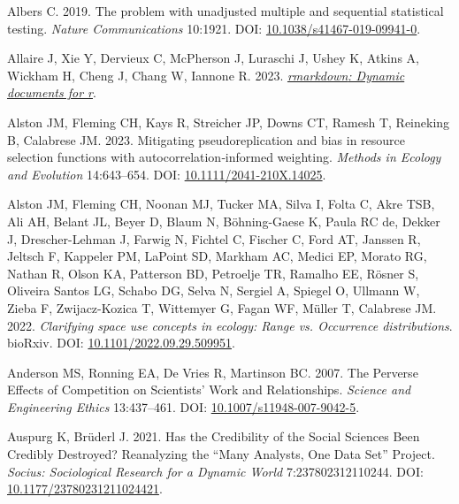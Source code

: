 \documentclass[10pt,a4paper]{article}
\newlength{\cslhangindent}
\newenvironment{CSLReferences}[2] %
 {\begin{list}{}{%
  \setlength{\itemindent}{0pt}
  \setlength{\leftmargin}{0pt}
  \setlength{\parsep}{0pt}
  \ifodd #1
   \setlength{\leftmargin}{\cslhangindent}
   \setlength{\itemindent}{-1\cslhangindent}
  \fi
  \setlength{\itemsep}{#2\baselineskip}}}
 {\end{list}}
\begin{document}
\label{refs}
\begin{CSLReferences}{1}{0}
Albers C. 2019. The problem with unadjusted multiple and sequential statistical testing. \emph{Nature Communications} 10:1921. DOI: \href{https://doi.org/10.1038/s41467-019-09941-0}{10.1038/s41467-019-09941-0}.

Allaire J, Xie Y, Dervieux C, McPherson J, Luraschi J, Ushey K, Atkins A, Wickham H, Cheng J, Chang W, Iannone R. 2023. \emph{\href{https://github.com/rstudio/rmarkdown}{{rmarkdown}: Dynamic documents for r}}.

Alston JM, Fleming CH, Kays R, Streicher JP, Downs CT, Ramesh T, Reineking B, Calabrese JM. 2023. Mitigating pseudoreplication and bias in resource selection functions with autocorrelation‐informed weighting. \emph{Methods in Ecology and Evolution} 14:643--654. DOI: \href{https://doi.org/10.1111/2041-210X.14025}{10.1111/2041-210X.14025}.

Alston JM, Fleming CH, Noonan MJ, Tucker MA, Silva I, Folta C, Akre TSB, Ali AH, Belant JL, Beyer D, Blaum N, Böhning-Gaese K, Paula RC de, Dekker J, Drescher-Lehman J, Farwig N, Fichtel C, Fischer C, Ford AT, Janssen R, Jeltsch F, Kappeler PM, LaPoint SD, Markham AC, Medici EP, Morato RG, Nathan R, Olson KA, Patterson BD, Petroelje TR, Ramalho EE, Rösner S, Oliveira Santos LG, Schabo DG, Selva N, Sergiel A, Spiegel O, Ullmann W, Zieba F, Zwijacz-Kozica T, Wittemyer G, Fagan WF, Müller T, Calabrese JM. 2022. \emph{Clarifying space use concepts in ecology: Range vs. Occurrence distributions}. bioRxiv. DOI: \href{https://doi.org/10.1101/2022.09.29.509951}{10.1101/2022.09.29.509951}.

Anderson MS, Ronning EA, De Vries R, Martinson BC. 2007. The {Perverse} {Effects} of {Competition} on {Scientists}' {Work} and {Relationships}. \emph{Science and Engineering Ethics} 13:437--461. DOI: \href{https://doi.org/10.1007/s11948-007-9042-5}{10.1007/s11948-007-9042-5}.

Auspurg K, Brüderl J. 2021. Has the {Credibility} of the {Social} {Sciences} {Been} {Credibly} {Destroyed}? {Reanalyzing} the {``{Many} {Analysts}, {One} {Data} {Set}''} {Project}. \emph{Socius: Sociological Research for a Dynamic World} 7:237802312110244. DOI: \href{https://doi.org/10.1177/23780231211024421}{10.1177/23780231211024421}.


\end{CSLReferences}
\end{document}

